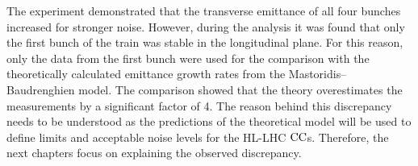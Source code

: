 The experiment demonstrated that the transverse emittance of all four bunches increased for stronger noise. However, during the analysis it was found that only the first bunch of the train was stable in the longitudinal plane. For this reason, only the data from the first bunch were used for the comparison with the theoretically calculated emittance growth rates from the Mastoridis--Baudrenghien model. The comparison showed that the theory overestimates the measurements by a significant factor of 4. The reason behind this discrepancy needs to be understood as the predictions of the theoretical model will be used to define limits and acceptable noise levels for the HL-LHC ${\mathrm{CC}}$s. Therefore, the next chapters focus on explaining the observed discrepancy.
